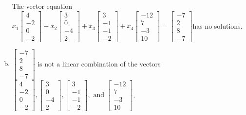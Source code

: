 \begin{exerciseAnswer}
\begin{enumerate}[(a)]
\begin{center}
\begin{minipage}{0.8\textwidth}
 The vector equation \( x_{1} \left[\begin{array}{c}
4 \\
-2 \\
0 \\
-2
\end{array}\right] + x_{2} \left[\begin{array}{c}
3 \\
0 \\
-4 \\
2
\end{array}\right] + x_{3} \left[\begin{array}{c}
3 \\
-1 \\
-1 \\
-2
\end{array}\right] + x_{4} \left[\begin{array}{c}
-12 \\
7 \\
-3 \\
10
\end{array}\right] = \left[\begin{array}{c}
-7 \\
2 \\
8 \\
-7
\end{array}\right] \)has no solutions.
\end{minipage}\end{center}
    
\item 

\( \left[\begin{array}{c}
-7 \\
2 \\
8 \\
-7
\end{array}\right] \) is not a linear combination of the vectors \( \left[\begin{array}{c}
4 \\
-2 \\
0 \\
-2
\end{array}\right] , \left[\begin{array}{c}
3 \\
0 \\
-4 \\
2
\end{array}\right] , \left[\begin{array}{c}
3 \\
-1 \\
-1 \\
-2
\end{array}\right] , \text{ and } \left[\begin{array}{c}
-12 \\
7 \\
-3 \\
10
\end{array}\right] \). 


\end{enumerate}
    
\end{exerciseAnswer}
    
